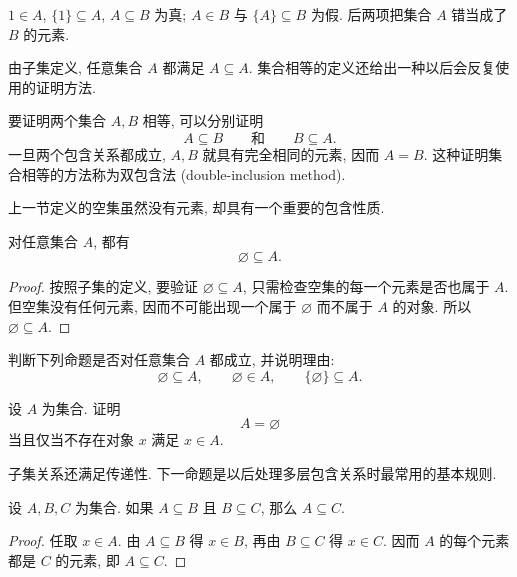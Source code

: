 \documentclass[usesamecnt, thmcnt=section, lang=cn, newtx, 10pt, scheme=chinese]{elegantbook}
\begin{document}
\begin{solution}
$1\in A$, $\{1\}\subseteq A$, $A\subseteq B$ 为真; $A\in B$ 与 $\{A\}\subseteq B$ 为假. 后两项把集合 $A$ 错当成了 $B$ 的元素.
\end{solution}

由子集定义, 任意集合 $A$ 都满足 $A\subseteq A$. 集合相等的定义还给出一种以后会反复使用的证明方法.

\begin{definition}[双包含法]\label{def:sets-double-inclusion}
要证明两个集合 $A,B$ 相等, 可以分别证明
\[
 A\subseteq B
 \qquad\text{和}\qquad
 B\subseteq A.
\]
一旦两个包含关系都成立, $A,B$ 就具有完全相同的元素, 因而 $A=B$. 这种证明集合相等的方法称为{\color{blue}双包含法 (double-inclusion method)}.
\end{definition}

上一节定义的空集虽然没有元素, 却具有一个重要的包含性质.

\begin{proposition}\label{prop:sets-empty-subset}
对任意集合 $A$, 都有
\[
 \varnothing\subseteq A.
\]
\end{proposition}

\begin{proof}
按照子集的定义, 要验证 $\varnothing\subseteq A$, 只需检查空集的每一个元素是否也属于 $A$. 但空集没有任何元素, 因而不可能出现一个属于 $\varnothing$ 而不属于 $A$ 的对象. 所以 $\varnothing\subseteq A$.
\end{proof}

\begin{exercise}\label{ex:sets-empty-01}
判断下列命题是否对任意集合 $A$ 都成立, 并说明理由:
\[
 \varnothing\subseteq A,\qquad
 \varnothing\in A,\qquad
 \{\varnothing\}\subseteq A.
\]
\end{exercise}

\begin{exercise}\label{ex:sets-empty-02}
设 $A$ 为集合. 证明
\[
 A=\varnothing
\]
当且仅当不存在对象 $x$ 满足 $x\in A$.
\end{exercise}

子集关系还满足传递性. 下一命题是以后处理多层包含关系时最常用的基本规则.

\begin{proposition}\label{prop:sets-subset-transitive}
设 $A,B,C$ 为集合. 如果 $A\subseteq B$ 且 $B\subseteq C$, 那么
$
 A\subseteq C$.

\end{proposition}

\begin{proof}
任取 $x\in A$. 由 $A\subseteq B$ 得 $x\in B$, 再由 $B\subseteq C$ 得 $x\in C$. 因而 $A$ 的每个元素都是 $C$ 的元素, 即 $A\subseteq C$.
\end{proof}
\end{document}

